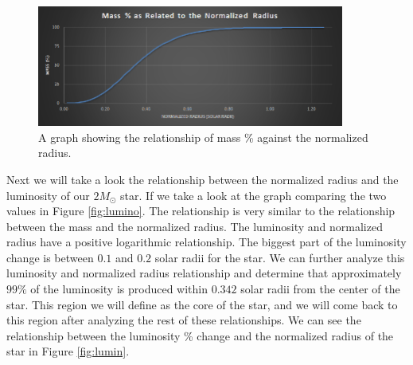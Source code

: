 \documentclass{article}
\begin{document}
\begin{figure}
  \centering
  \includegraphics[width=0.9\textwidth]{mass.png}
  \caption{A graph showing the relationship of mass \% against the normalized radius.}
  \label{fig:mass}
\end{figure}

\begin{multicols}{2}

Next we will take a look the relationship between the normalized radius and the luminosity of our $2M_\odot$ star. If we take a look at the graph comparing the two values in Figure \ref{fig:lumino}. The relationship is very similar to the relationship between the mass and the normalized radius. The luminosity and normalized radius have a positive logarithmic relationship. The biggest part of the luminosity change is between $0.1$ and $0.2$ solar radii for the star. We can further analyze this luminosity and normalized radius relationship and determine that approximately $99\%$ of the luminosity is produced within $0.342$ solar radii from the center of the star. This region we will define as the core of the star, and we will come back to this region after analyzing the rest of these relationships. We can see the relationship between the luminosity \% change and the normalized radius of the star in Figure \ref{fig:lumin}.\\\\\\\\\\
\end{multicols}
\end{document}
